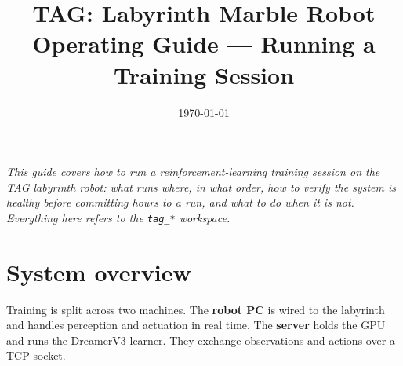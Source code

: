 \documentclass[11pt,a4paper]{article}
\title{\textbf{TAG: Labyrinth Marble Robot}\\[2mm]
       \large Operating Guide --- Running a Training Session}
\author{}
\date{\today}
\newcommand{\file}[1]{\texttt{\small #1}}
\begin{document}
\maketitle
\thispagestyle{empty}

\begin{center}
\begin{minipage}{0.9\textwidth}
\small\itshape
This guide covers how to run a reinforcement-learning training session on the TAG
labyrinth robot: what runs where, in what order, how to verify the system is
healthy before committing hours to a run, and what to do when it is not.
Everything here refers to the \file{tag\_*} workspace.
\end{minipage}
\end{center}
\vspace{4mm}

\tableofcontents
\newpage

\section{System overview}

Training is split across two machines. The \textbf{robot PC} is wired to the
labyrinth and handles perception and actuation in real time. The \textbf{server}
holds the GPU and runs the DreamerV3 learner. They exchange observations and
actions over a TCP socket.
\end{document}

